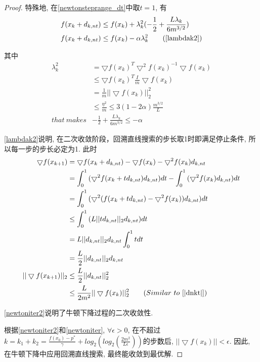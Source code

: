 \documentclass[UTF8]{ctexart}
\theoremstyle{Defination}
\theoremstyle{remark}
\begin{document}
\begin{proof}
特殊地, 在\autoref{newtonsteprange_dt}中取$t=1$, 有
\begin{equation}
\label{newtonsteprange1}
\begin{aligned}
f(x_k+d_{k,nt}) & \leq f(x_k)+\lambda_k^2(-\frac{1}{2}+\frac{L\lambda_k}{6m^{3/2}}) \\
f(x_k+d_{k,nt}) & \leq f(x_k)-\alpha\lambda_k^2\qquad(\autoref{lambdak2})
\end{aligned}
\end{equation}

其中
\begin{equation}
\label{lambdak2}
\begin{aligned}
\lambda_k^2  & =\bigtriangledown f(x_k)^T\bigtriangledown^2f(x_k)^{-1}\bigtriangledown f(x_k) \\
 & \leq\bigtriangledown f(x_k)^T\frac{I}{m}\bigtriangledown f(x_k) \\
 & =\frac{1}{m}||\bigtriangledown f(x_k)||_2^2 \\
 & \leq\frac{\eta^2}{m}\leq 3(1-2\alpha)\frac{m^{3/2}}{L} \\
that\ makes & -\frac{1}{2}+\frac{L\lambda_k}{6m^{3/2}}\leq-\alpha
\end{aligned}
\end{equation}

\autoref{lambdak2}说明, 在二次收敛阶段，回溯直线搜索的步长取1时即满足停止条件, 所以每一步的步长必定为1. 此时
\begin{equation}
\label{newtoniter2}
\begin{aligned}
\bigtriangledown f(x_{k+1}) & =\bigtriangledown f(x_k+d_{k,nt})-\bigtriangledown f(x_k)-\bigtriangledown^2f(x_k)d_{k,nt} \\
 & =\int_0^1{(\bigtriangledown^2f(x_k+td_{k,nt})d_{k,nt})dt}-\int_0^1{(\bigtriangledown^2f(x_k)d_{k,nt})dt} \\
 & =\int_0^1{(\bigtriangledown^2(f(x_k+td_{k,nt})-\bigtriangledown^2f(x_k))d_{k,nt})dt} \\
 & \leq\int_0^1{(L||td_{k,nt}||_2d_{k,nt})dt} \\
 & =L||d_{k,nt}||_2d_{k,nt}\int_0^1{tdt} \\
 & =\frac{L}{2}||d_{k,nt}||_2d_{k,nt} \\
||\bigtriangledown f(x_{k+1})||_2 & \leq\frac{L}{2}||d_{k,nt}||_2^2 \\
 & \leq\frac{L}{2m^2}||\bigtriangledown f(x_k)||_2^2\qquad(Similar\ to\ \autoref{|dnkt|})
\end{aligned}
\end{equation}

\autoref{newtoniter2}说明了牛顿下降过程的二次收敛性. 

根据\autoref{newtoniter2}和\autoref{newtoniter}, $\forall\epsilon>0$, 在不超过$k=k_1+k_2=\frac{f(x_0)-p^*}{\gamma}+log_2(log_2(\frac{2m^2}{L\epsilon}))$的步数后, $||\bigtriangledown f(x_k)||<\epsilon$. 因此, 在牛顿下降中应用回溯直线搜索, 最终能收敛到最优解. 

\end{proof}
\end{document}
